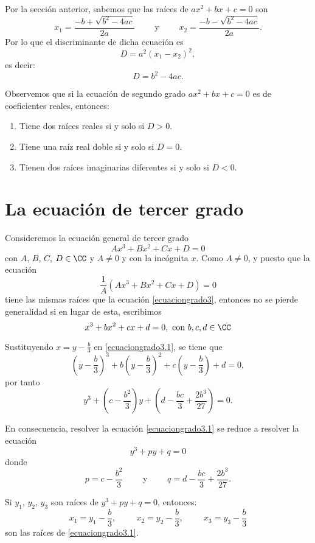 Por la sección anterior, sabemos que las raíces de $ax^2+bx+c=0$ son
$$x_1=\frac{-b + \sqrt{b^2-4ac}}{2a} \qquad \text{ y } \qquad x_2=\frac{-b - \sqrt{b^2-4ac}}{2a}.$$
Por lo que el discriminante de dicha ecuación es
$$D=a^2(x_1-x_2)^2,$$
es decir:
$$D=b^2-4ac.$$

Observemos que si la ecuación de segundo grado $ax^2+bx+c=0$ es de coeficientes reales, entonces:
\begin{enumerate}[label=\roman*.]
    \item Tiene dos raíces reales si y solo si $D>0$.
    \item Tiene una raíz real doble si y solo si $D=0$.
    \item Tienen dos raíces imaginarias diferentes si y solo si $D<0$.
\end{enumerate}

\section{La ecuación de tercer grado} \label{sec:B4}

Consideremos la ecuación general de tercer grado
\begin{equation}
    Ax^3+Bx^2+Cx+D=0 \label{ecuaciongrado3}
\end{equation}
con $A$, $B$, $C$, $D \in \CC$ y $A \neq 0$ y con la incógnita $x$. Como $A \neq 0$, y puesto que la ecuación
$$\frac{1}{A} \left( Ax^3+Bx^2+Cx+D \right) =0$$
tiene las mismas raíces que la ecuación \eqref{ecuaciongrado3}, entonces no se pierde generalidad si en lugar de esta, escribimos
\begin{equation}
    x^3+bx^2+cx+d=0, \text{ con }  b,  c,  d \in \CC \label{ecuaciongrado3.1}
\end{equation}

Sustituyendo $\displaystyle x=y-\frac{b}{3}$ en \eqref{ecuaciongrado3.1}, se tiene que
$$\left( y-\frac{b}{3} \right)^3+b \left( y-\frac{b}{3} \right)^2+c \left( y-\frac{b}{3} \right) +d=0,$$
por tanto
$$y^3+\left( c-\frac{b^2}{3} \right) y + \left( d-\frac{bc}{3}+\frac{2b^3}{27} \right) =0.$$

\newpage

En consecuencia, resolver la ecuación \eqref{ecuaciongrado3.1} se reduce a resolver la ecuación
$$y^3+py+q=0$$
donde
$$p=c-\frac{b^2}{3} \qquad \text{ y } \qquad q=d-\frac{bc}{3}+\frac{2b^3}{27}.$$

Si $y_1$, $y_2$, $y_3$ son raíces de $y^3+py+q=0$, entonces:
$$x_1=y_1-\frac{b}{3}, \hspace{1cm} x_2=y_2-\frac{b}{3}, \hspace{1cm} x_3=y_3-\frac{b}{3}$$
son las raíces de \eqref{ecuaciongrado3.1}.

